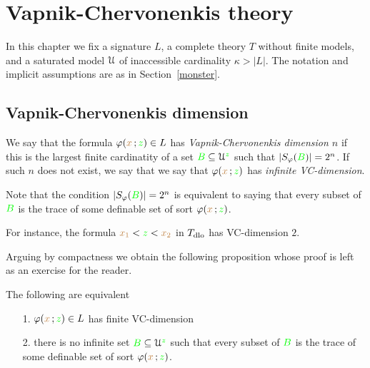 \chapter{Vapnik-Chervonenkis theory}
\label{vc}

\def\medrel#1{\parbox[t]{6ex}{$\displaystyle\hfil #1$}}
\def\ceq#1#2#3{\parbox{25ex}{$\displaystyle #1$}\medrel{#2}$\displaystyle  #3$}



In this chapter we fix a signature $L$, a complete theory $T$ without finite models, and a saturated model $\EuScript U$ of inaccessible cardinality $\kappa>|L|$.
The notation and implicit assumptions are as in Section~\ref{monster}.



\section{Vapnik-Chervonenkis dimension}
\label{VCdim}

\def\ceq#1#2#3{\parbox{25ex}{$\displaystyle #1$}\medrel{#2}$\displaystyle  #3$}

We say that the formula $\varphi({\color{brown} x}\,;{\color{green} z})\in L$ has \emph{Vapnik-Chervonenkis dimension $n$\/} if this is the largest finite cardinatity of a set ${\color{green} B}\subseteq\EuScript U^{\color{green} z}$ such that $|S_\varphi({\color{green} B})|=2^n$. If such $n$ does not exist, we say that we say that  $\varphi({\color{brown} x}\,;{\color{green} z})$ has \emph{infinite VC-dimension}. 

Note that the condition $|S_\varphi({\color{green} B})|=2^n$ is equivalent to saying that every subset of ${\color{green} B}$ is the trace of some definable set of sort $\varphi({\color{brown} x}\,;{\color{green} z})$.

For instance, the formula ${\color{brown} x_1}<{\color{green} z}<{\color{brown} x_2}$ in $T_{\rm dlo}$ has VC-dimension $2$.

Arguing by compactness we obtain the following proposition whose proof is left as an exercise for the reader.

\begin{proposition}
The following are equivalent 
\begin{itemize}
\item[1.] $\varphi({\color{brown} x}\,;{\color{green} z})\in L$ has finite VC-dimension
\item[2.] there is no infinite set ${\color{green} B}\subseteq\EuScript U^{\color{green} z}$ such that every subset of ${\color{green} B}$ is the trace of some definable set of sort $\varphi({\color{brown} x}\,;{\color{green} z})$.\QED
\end{itemize}
\end{proposition}

